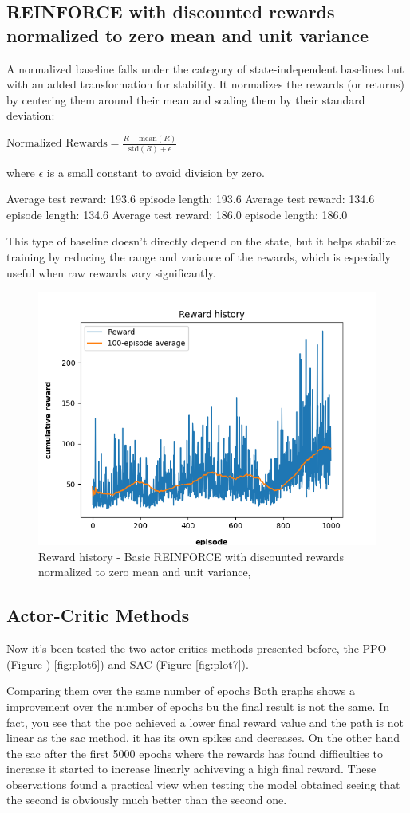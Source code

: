 \documentclass{article}
\begin{document}
\subsection{REINFORCE with discounted rewards normalized to zero mean and unit variance}
A normalized baseline falls under the category of state-independent baselines but with an added transformation for stability. It normalizes the rewards (or returns) by centering them around their mean and scaling them by their standard deviation:

$\text{Normalized Rewards} = \frac{R - \text{mean}(R)}{\text{std}(R) + \epsilon}$

where  $\epsilon$  is a small constant to avoid division by zero.


Average test reward: 193.6 episode length: 193.6
Average test reward: 134.6 episode length: 134.6
Average test reward: 186.0 episode length: 186.0

This type of baseline doesn’t directly depend on the state, but it helps stabilize training by reducing the range and variance of the rewards, which is especially useful when raw rewards vary significantly.

\begin{figure}[h]
	\centering
	\includegraphics[width=0.5\linewidth]{../data/plot/reward_history_ContinuousCartPole-v0_0_normalized.png}
	\caption{Reward history - Basic REINFORCE with discounted rewards normalized to zero mean and unit variance,}
	\label{fig:plot5}
\end{figure}


\subsection{Actor-Critic Methods}
Now it's been tested the two actor critics methods presented before, the PPO (Figure ) \ref{fig:plot6}) and SAC (Figure \ref{fig:plot7}).


Comparing them over the same number of epochs Both graphs shows a improvement over the number of epochs bu the final result is not the same. In fact, you see that the poc achieved a lower final reward value and the path is not linear as the sac method, it has its own spikes and decreases. On the other hand the sac after the first 5000 epochs where the rewards has found difficulties to increase it started to increase linearly achiveving a high final reward.
These observations found a practical view when testing the model obtained seeing that the second is obviously much better than the second one.
\end{document}
